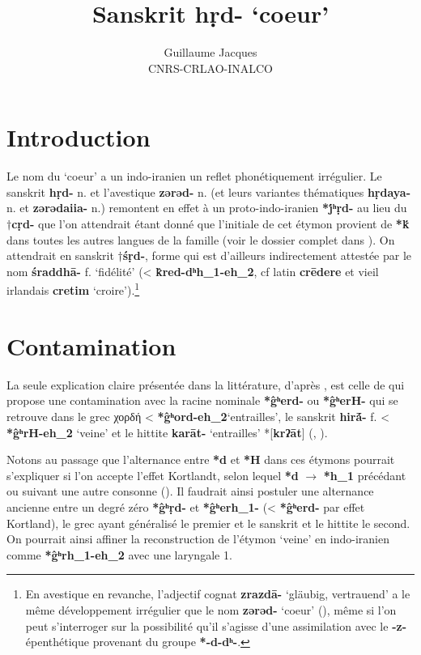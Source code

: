 \documentclass{article}
\newcommand{\ipa}[1]{{\phon\textbf{#1}}}
\newcommand{\grec}[1]{{\mleccha #1}}
\begin{document}
 
\title{Sanskrit \ipa{hṛd-} `coeur'}
\author{Guillaume Jacques\\ CNRS-CRLAO-INALCO}
\maketitle

\section*{Introduction}
Le nom du `coeur' a un indo-iranien un reflet phonétiquement irrégulier. Le sanskrit \ipa{hṛd-} n. et l'avestique \ipa{zərəd-} n. (et leurs variantes thématiques \ipa{hṛdaya-} n. et \ipa{zərədaiia-} n.) remontent en effet à un proto-indo-iranien \ipa{*j́ʰṛd-} au lieu du $\dagger$\ipa{cṛd-} que l'on attendrait étant donné que l'initiale de cet étymon provient de \ipa{*ḱ} dans toutes les autres langues de la famille (voir le dossier complet dans \citealt[417-423]{wodtko08NIL}). On attendrait en sanskrit $\dagger$\ipa{śṛd-}, forme qui est d'ailleurs  indirectement attestée par le nom \ipa{śraddhā-} f. `fidélité' (< \ipa{k̂red-dʰh_1-eh_2}, cf latin \ipa{crēdere} et vieil irlandais \ipa{cretim} `croire').\footnote{En avestique en revanche, l'adjectif cognat \ipa{zrazdā-} `gläubig, vertrauend' a le même développement irrégulier que le nom \ipa{zərəd-} `coeur' (\citealt[663]{mayrhofer92ewa}), même si l'on peut s'interroger sur la possibilité qu'il s'agisse d'une assimilation avec le \ipa{-z-} épenthétique provenant du groupe \ipa{*-d-dʰ-}. }

\section{Contamination} \label{sec:hira}
La seule explication claire présentée dans la littérature, d'après \citet[420]{wodtko08NIL}, est celle de \citet{szemerenyi70heart} qui propose une contamination avec la racine nominale \ipa{*ĝʰerd-} ou \ipa{*ĝʰerH-} qui se retrouve dans le grec \grec{χορδή} < \ipa{*ĝʰord-eh_2}`entrailles', le sanskrit \ipa{hirā́-} f. < \ipa{*ĝʰrH-eh_2} `veine' et le hittite \ipa{karāt-} `entrailles' *[\ipa{krʔāt}] (\citealt[208]{schrijver91laryngeals}, \citealt[446]{kloekhorst08edhil}).

Notons au passage que l'alternance entre \ipa{*d} et \ipa{*H} dans ces étymons pourrait s'expliquer si l'on accepte l'effet Kortlandt, selon lequel \ipa{*d} $\rightarrow$ \ipa{*h_1} précédant ou suivant  une autre consonne (\citealt{kortlandt83numerals, garnier14kortlandt}). Il faudrait ainsi postuler une alternance ancienne entre un degré zéro \ipa{*ĝʰṛd-} et  \ipa{*ĝʰerh_1-} (< \ipa{*ĝʰerd-} par effet Kortland), le grec ayant généralisé le premier et le sanskrit et le hittite le second. On pourrait ainsi affiner la reconstruction de l'étymon `veine' en indo-iranien comme \ipa{*ĝʰrh_1-eh_2} avec une laryngale 1.
\end{document}
